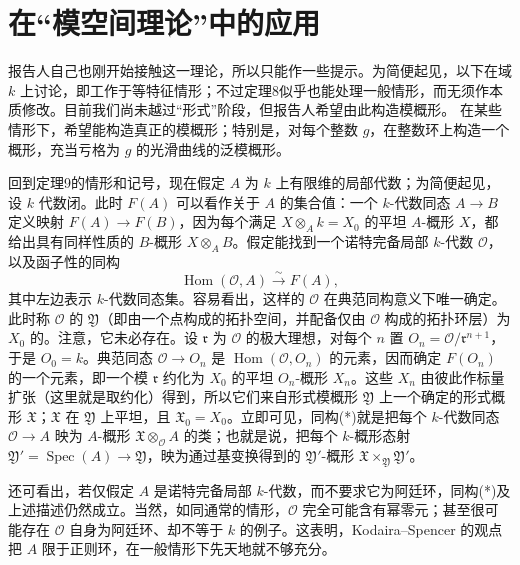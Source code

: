 \section{在“模空间理论”中的应用}
报告人自己也刚开始接触这一理论，所以只能作一些提示。为简便起见，以下在域 $k$ 上讨论，即工作于等特征情形；不过定理8似乎也能处理一般情形，而无须作本质修改。目前我们尚未越过“形式”阶段，但报告人希望由此构造模概形。
在某些情形下，希望能构造真正的模概形；特别是，对每个整数 $g$，在整数环上构造一个概形，充当亏格为 $g$ 的光滑曲线的泛模概形。

回到定理9的情形和记号，现在假定 $A$ 为 $k$ 上有限维的局部代数；为简便起见，设 $k$ 代数闭。此时 $F(A)$ 可以看作关于 $A$ 的集合值：一个 $k$-代数同态 $A\to B$ 定义映射 $F(A)\to F(B)$，因为每个满足 $X\otimes_Ak=X_0$ 的平坦 $A$-概形 $X$，都给出具有同样性质的 $B$-概形 $X\otimes_AB$。假定能找到一个诺特完备局部 $k$-代数 $\mathcal O$，以及函子性的同构
\[
\operatorname{Hom}(\mathcal O,A)\xrightarrow{\sim}F(A),\tag{*}\label{f-moduli-star}
\]
其中左边表示 $k$-代数同态集。容易看出，这样的 $\mathcal O$ 在典范同构意义下唯一确定。此时称 $\mathcal O$ 的 $\mathfrak Y$（即由一个点构成的拓扑空间，并配备仅由 $\mathcal O$ 构成的拓扑环层）为 $X_0$ 的。注意，它未必存在。设 $\mathfrak r$ 为 $\mathcal O$ 的极大理想，对每个 $n$ 置 $O_n=\mathcal O/\mathfrak r^{n+1}$，于是 $O_0=k$。典范同态 $\mathcal O\to O_n$ 是 $\operatorname{Hom}(\mathcal O,O_n)$ 的元素，因而确定 $F(O_n)$ 的一个元素，即一个模 $\mathfrak r$ 约化为 $X_0$ 的平坦 $O_n$-概形 $X_n$。这些 $X_n$ 由彼此作标量扩张（这里就是取约化）得到，所以它们来自形式模概形 $\mathfrak Y$ 上一个确定的形式概形 $\mathfrak X$；$\mathfrak X$ 在 $\mathfrak Y$ 上平坦，且 $\mathfrak X_0=X_0$。立即可见，同构(*)就是把每个 $k$-代数同态 $\mathcal O\to A$ 映为 $A$-概形 $\mathfrak X\otimes_{\mathcal O}A$ 的类；也就是说，把每个 $k$-概形态射 $\mathfrak Y'=\operatorname{Spec}(A)\to\mathfrak Y$，映为通过基变换得到的 $\mathfrak Y'$-概形 $\mathfrak X\times_{\mathfrak Y}\mathfrak Y'$。

还可看出，若仅假定 $A$ 是诺特完备局部 $k$-代数，而不要求它为阿廷环，同构(*)及上述描述仍然成立。当然，如同通常的情形，$\mathcal O$ 完全可能含有幂零元；甚至很可能存在 $\mathcal O$ 自身为阿廷环、却不等于 $k$ 的例子。这表明，Kodaira--Spencer 的观点把 $A$ 限于正则环，在一般情形下先天地就不够充分。

